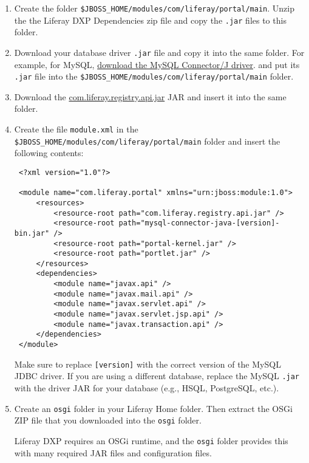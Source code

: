\begin{enumerate}
\def\labelenumi{\arabic{enumi}.}
\item
  Create the folder
  \texttt{\$JBOSS\_HOME/modules/com/liferay/portal/main}. Unzip the the
  Liferay DXP Dependencies zip file and copy the \texttt{.jar} files to
  this folder.
\item
  Download your database driver \texttt{.jar} file and copy it into the
  same folder. For example, for MySQL,
  \href{http://dev.mysql.com/downloads/connector/j/}{download the MySQL
  Connector/J driver}. and put its \texttt{.jar} file into the
  \texttt{\$JBOSS\_HOME/modules/com/liferay/portal/main} folder.
\item
  Download the
  \href{https://repository.liferay.com/nexus/content/repositories/liferay-public-releases/com/liferay/com.liferay.registry.api}{com.liferay.registry.api.jar}
  JAR and insert it into the same folder.
\item
  Create the file \texttt{module.xml} in the
  \texttt{\$JBOSS\_HOME/modules/com/liferay/portal/main} folder and
  insert the following contents:

\begin{verbatim}
 <?xml version="1.0"?>

 <module name="com.liferay.portal" xmlns="urn:jboss:module:1.0">
     <resources>
         <resource-root path="com.liferay.registry.api.jar" />
         <resource-root path="mysql-connector-java-[version]-bin.jar" />
         <resource-root path="portal-kernel.jar" />
         <resource-root path="portlet.jar" />
     </resources>
     <dependencies>
         <module name="javax.api" />
         <module name="javax.mail.api" />
         <module name="javax.servlet.api" />
         <module name="javax.servlet.jsp.api" />
         <module name="javax.transaction.api" />
     </dependencies>
 </module>
\end{verbatim}

  Make sure to replace \texttt{{[}version{]}} with the correct version
  of the MySQL JDBC driver. If you are using a different database,
  replace the MySQL \texttt{.jar} with the driver JAR for your database
  (e.g., HSQL, PostgreSQL, etc.).
\item
  Create an \texttt{osgi} folder in your Liferay Home folder. Then
  extract the OSGi ZIP file that you downloaded into the \texttt{osgi}
  folder.

  Liferay DXP requires an OSGi runtime, and the \texttt{osgi} folder
  provides this with many required JAR files and configuration files.
\end{enumerate}

